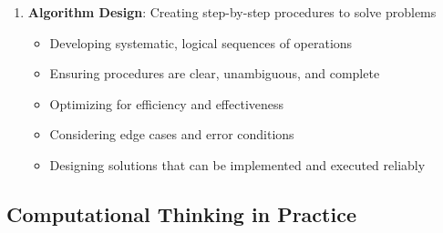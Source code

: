 \begin{enumerate}
  \item \textbf{Algorithm Design}: Creating step-by-step procedures to solve problems
  \begin{itemize}
    \item Developing systematic, logical sequences of operations
    \item Ensuring procedures are clear, unambiguous, and complete
    \item Optimizing for efficiency and effectiveness
    \item Considering edge cases and error conditions
    \item Designing solutions that can be implemented and executed reliably
  \end{itemize}
\end{enumerate}

\subsection{Computational Thinking in Practice}

